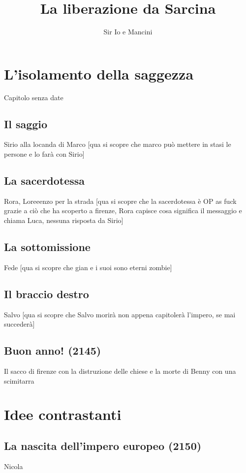 \documentclass{book}
\title{La liberazione da Sarcina}
\author{Sir Io e Mancini}
\date{}
\begin{document}
\maketitle
\tableofcontents

  
\chapter{L'isolamento della saggezza}
Capitolo senza date
\section{Il saggio}
Sirio alla locanda di Marco [qua si scopre che marco può mettere in stasi le persone e lo farà con Sirio]

\section{La sacerdotessa}
Rora, Loreeenzo per la strada [qua si scopre che la sacerdotessa è OP as fuck grazie a ciò che ha scoperto a firenze, Rora capisce cosa significa il messaggio e chiama Luca, nessuna risposta da Sirio]

\section{La sottomissione}
Fede [qua si scopre che gian e i suoi sono eterni zombie]

\section{Il braccio destro}
Salvo [qua si scopre che Salvo morirà non appena capitolerà l'impero, se mai succederà]

\section{Buon anno! (2145)}
Il sacco di firenze con la distruzione delle chiese e la morte di Benny con una scimitarra


\chapter{Idee contrastanti}

\section{La nascita dell'impero europeo (2150)}
Nicola
\end{document}
